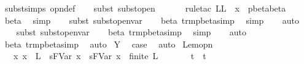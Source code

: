 \begin{isabellebody}
\ subst{\isachardot}simps\ opn{\isacharprime}{\isacharunderscore}def\isanewline
\ \ \isamarkupfalse%
\ {\isacharparenleft}subst\ subst{\isacharunderscore}open{\isacharparenright}\isanewline
\ \ \isamarkupfalse%
\isanewline
\ \ \isamarkupfalse%
\ {\isacharparenleft}rule{\isacharunderscore}tac\ L{\isacharequal}{\isachardoublequoteopen}L\ {\isasymunion}\ {\isacharbraceleft}x{\isacharbraceright}{\isachardoublequoteclose}\ \ pbeta{\isacharunderscore}beta{\isacharprime}{\isacharparenright}\isanewline
\ \ \isamarkupfalse%
\ beta\ \isamarkupfalse%
\ simp\isanewline
\ \ \isamarkupfalse%
\ {\isacharparenleft}subst\ subst{\isacharunderscore}open{\isacharunderscore}var{}{\isacharparenright}\isanewline
\ \ \isamarkupfalse%
\ beta\ trm{\isacharunderscore}pbeta{\isacharunderscore}simp{}\ \isamarkupfalse%
\ simp\isanewline
\ \ \isamarkupfalse%
\ auto{\isacharbrackleft}{}{\isacharbrackright}\isanewline
\ \ \isamarkupfalse%
\ {\isacharparenleft}subst\ subst{\isacharunderscore}open{\isacharunderscore}var{}{\isacharparenright}\isanewline
\ \ \isamarkupfalse%
\ beta\ trm{\isacharunderscore}pbeta{\isacharunderscore}simp{}\ \isamarkupfalse%
\ simp\isanewline
\ \ \isamarkupfalse%
\ auto{\isacharbrackleft}{}{\isacharbrackright}\isanewline
\ \ \isamarkupfalse%
\ beta\ trm{\isacharunderscore}pbeta{\isacharunderscore}simp{}\ \isamarkupfalse%
\ auto\isanewline
{}\isamarkupfalse%
\isanewline
{}\isamarkupfalse%
\ Y\ \isamarkupfalse%
\ {\isacharquery}case\ \isamarkupfalse%
\ auto\isanewline
{}\isamarkupfalse%
%
\endisatagproof
{\isafoldproof}%
%
\isadelimproof
\isanewline
%
\endisadelimproof
\isanewline
{}\isamarkupfalse%
\ Lem{}{\isacharunderscore}{}{\isacharunderscore}{}opn{\isacharcolon}\isanewline
\ \ \ {\isachardoublequoteopen}{\isasymAnd}x{\isachardot}\ x\ {\isasymnotin}\ L\ {\isasymLongrightarrow}\ s{\isacharcircum}FVar\ x\ {\isasymggreater}\ s{\isacharprime}{\isacharcircum}FVar\ x{\isachardoublequoteclose}\ \ {\isachardoublequoteopen}finite\ L{\isachardoublequoteclose}\isanewline
\ \ \ \ \ \ \ {\isachardoublequoteopen}t\ {\isasymggreater}\ t{\isacharprime}{\isachardoublequoteclose}\isanewline

\end{isabellebody}
